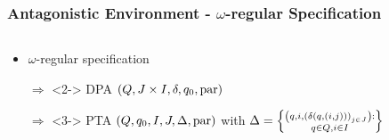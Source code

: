 \documentclass{beamer}
\begin{document}
  \begin{frame}
    \frametitle{Antagonistic Environment - $\omega$-regular Specification}
    \begin{columns}
      \begin{column}{0.5\textwidth}
        \begin{itemize}
          \item $\omega$-regular specification
          \item[$\Rightarrow$]<2-> \ac{DPA} $\left(Q, J\times I, \delta,
            q_{0}, \operatorname{par}\right)$
          \item[$\Rightarrow$]<3-> \ac{PTA}
            $\left(Q, q_{0}, I, J, \Delta, \operatorname{par}\right)$ with
          $\Delta = \left\{\substack{\left(q, i, \left(\delta(q,
            \left(i, j\right))\right)_{j\in J}\right):\\q\in Q, i\in I}\right\}$
        \end{itemize}
      \end{column}
      \begin{column}{0.5\textwidth}
      \end{column}
    \end{columns}
  \end{frame}
\end{document}
